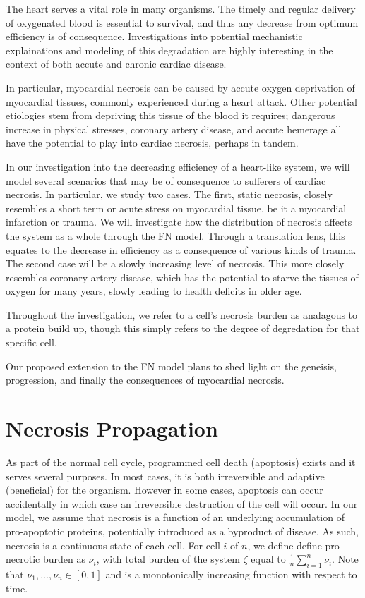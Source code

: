 \documentclass[11pt]{report}
\begin{document}
The heart serves a vital role in many organisms. The timely and regular delivery of oxygenated blood is essential to survival, and thus any decrease from optimum efficiency is of consequence. Investigations into potential mechanistic explainations and modeling of this degradation are highly interesting in the context of both accute and chronic cardiac disease.

In particular, myocardial necrosis can be caused by accute oxygen deprivation of myocardial tissues, commonly experienced during a heart attack. Other potential etiologies stem from depriving this tissue of the blood it requires; dangerous increase in physical stresses, coronary artery disease, and accute hemerage all have the potential to play into cardiac necrosis, perhaps in tandem. 

In our investigation into the decreasing efficiency of a heart-like system, we will model several scenarios that may be of consequence to sufferers of cardiac necrosis. In particular, we study two cases. The first, static necrosis, closely resembles a short term or acute stress on myocardial tissue, be it a myocardial infarction or trauma. We will investigate how the distribution of necrosis affects the system as a whole through the FN model. Through a translation lens, this equates to the decrease in efficiency as a consequence of various kinds of trauma. The second case will be a slowly increasing level of necrosis. This more closely resembles coronary artery disease, which has the potential to starve the tissues of oxygen for many years, slowly leading to health deficits in older age. 

Throughout the investigation, we refer to a cell's necrosis burden as analagous to a protein build up, though this simply refers to the degree of degredation for that specific cell.

Our proposed extension to the FN model plans to shed light on the geneisis, progression, and finally the consequences of myocardial necrosis. 

\section{Necrosis Propagation}

As part of the normal cell cycle, programmed cell death (apoptosis) exists and it serves several purposes. In most cases, it is both irreversible and adaptive (beneficial) for the organism. However in some cases, apoptosis can occur accidentally in which case an irreversible destruction of the cell will occur. In our model, we assume that necrosis is a function of an underlying accumulation of pro-apoptotic proteins, potentially introduced as a byproduct of disease. As such, necrosis is a continuous state of each cell. For cell $i$ of $n$, we define define pro-necrotic burden as $\nu_i$, with total burden of the system $\zeta$ equal to $\frac{1}{n} \sum^n_{i=1} \nu_i$. Note that $\nu_{1}, ..., \nu_{n} \in [0,1]$ and is a monotonically increasing function with respect to time. 
\end{document}
